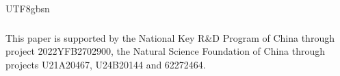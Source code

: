 \documentclass[runningheads]{llncs}
\begin{document}
\begin{CJK*}{UTF8}{gbsn}
\begin{credits}
\subsubsection{\ackname} This paper is supported by the National Key R\&D Program of China through project 2022YFB2702900, the Natural Science Foundation of China through projects U21A20467, U24B20144 and 62272464.
\end{credits}






\end{CJK*}
\end{document}
